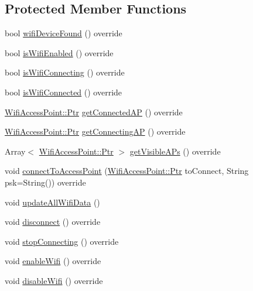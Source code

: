 \subsection*{Protected Member Functions}
\begin{DoxyCompactItemize}
\item 
bool \mbox{\hyperlink{classLibNMInterface_a78f5de282c47c78e87ffa21ea542475b}{wifi\+Device\+Found}} () override
\item 
bool \mbox{\hyperlink{classLibNMInterface_aded8fa727a07bfac38828815bf607c61}{is\+Wifi\+Enabled}} () override
\item 
bool \mbox{\hyperlink{classLibNMInterface_a78c4b23cbf834a6352c5351b7aedb1c1}{is\+Wifi\+Connecting}} () override
\item 
bool \mbox{\hyperlink{classLibNMInterface_afb02b052a8c2a67ce2865d3faf689c39}{is\+Wifi\+Connected}} () override
\item 
\mbox{\hyperlink{classWifiAccessPoint_ad18977f884076774803027efbaa131a0}{Wifi\+Access\+Point\+::\+Ptr}} \mbox{\hyperlink{classLibNMInterface_a92020826593a03979017bd7fb0c143a5}{get\+Connected\+AP}} () override
\item 
\mbox{\hyperlink{classWifiAccessPoint_ad18977f884076774803027efbaa131a0}{Wifi\+Access\+Point\+::\+Ptr}} \mbox{\hyperlink{classLibNMInterface_a79b0bb8661be490b6cbb68abfdc93152}{get\+Connecting\+AP}} () override
\item 
Array$<$ \mbox{\hyperlink{classWifiAccessPoint_ad18977f884076774803027efbaa131a0}{Wifi\+Access\+Point\+::\+Ptr}} $>$ \mbox{\hyperlink{classLibNMInterface_a52834cf27d1d7ea06939695c9caebca1}{get\+Visible\+A\+Ps}} () override
\item 
void \mbox{\hyperlink{classLibNMInterface_ac0e06cb2f360cd1cb16b50d4feff92c7}{connect\+To\+Access\+Point}} (\mbox{\hyperlink{classWifiAccessPoint_ad18977f884076774803027efbaa131a0}{Wifi\+Access\+Point\+::\+Ptr}} to\+Connect, String psk=String()) override
\item 
void \mbox{\hyperlink{classLibNMInterface_afdb4daa97cc16cd38b154921969c4237}{update\+All\+Wifi\+Data}} ()
\item 
void \mbox{\hyperlink{classLibNMInterface_af86c4e620e1292428e8955bad4617805}{disconnect}} () override
\item 
void \mbox{\hyperlink{classLibNMInterface_a46a4b026d110f3f397bd74aa413a6276}{stop\+Connecting}} () override
\item 
void \mbox{\hyperlink{classLibNMInterface_ab50348ebed5778ecc56346e7b3419978}{enable\+Wifi}} () override
\item 
void \mbox{\hyperlink{classLibNMInterface_a49b4c61f6f8794d6af742464ab0f2d93}{disable\+Wifi}} () override
\end{DoxyCompactItemize}
